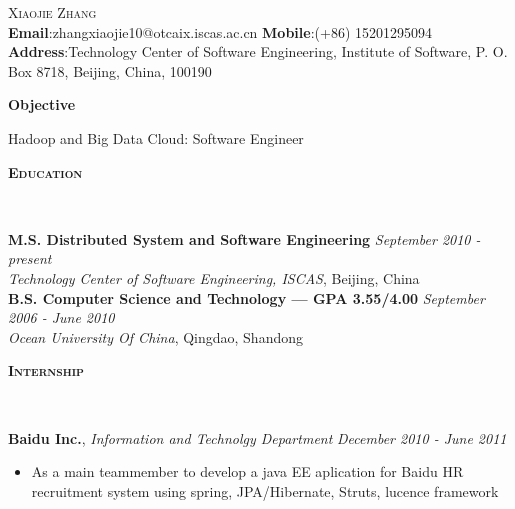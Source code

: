 \documentclass[9pt]{article}
\newenvironment{changemargin}[2]{%
  \begin{list}{}{%
    \setlength{\topsep}{0pt}%
    \setlength{\leftmargin}{#1}%
    \setlength{\rightmargin}{#2}%
    \setlength{\listparindent}{\parindent}%
    \setlength{\itemindent}{\parindent}%
    \setlength{\parsep}{\parskip}%
  }%
  \item[]}{\end{list}
}
\newcommand{\lineover}{
	\begin{changemargin}{-0.05in}{-0.05in}
		\vspace*{-8pt}
		\hrulefill \\
		\vspace*{-2pt}
	\end{changemargin}
}
\newcommand{\header}[1]{
	\begin{changemargin}{-0.5in}{-0.5in}
		\scshape{#1}\\
  	\lineover
	\end{changemargin}
}
\newcommand{\contact}[4]{
	\begin{changemargin}{-0.5in}{-0.5in}
		\begin{center}
			{\Large \scshape {#1}}\\ \smallskip
			{#2}\\ \smallskip 
			{#3}\\ \smallskip
			{#4}\smallskip
		\end{center}
	\end{changemargin}
}
\newenvironment{body} {
	\vspace*{-16pt}
	\begin{changemargin}{-0.25in}{-0.5in}
  }	
	{\end{changemargin}
}
\begin{document}
\contact{Xiaojie Zhang}{ \textbf{Email}:zhangxiaojie10@otcaix.iscas.ac.cn    \textbf {Mobile}:(+86) 15201295094}{\small \textbf{Address}:Technology Center of Software Engineering, Institute of Software, P. O. Box 8718, Beijing, China, 100190
}


\header{\textbf{Objective}}
\begin{body}
	\vspace{14pt}
	Hadoop and Big Data Cloud: Software Engineer
\end{body}

\smallskip


\header{\textbf{Education}}

\begin{body}
	\vspace{14pt}
	\textbf{M.S. Distributed System and Software Engineering }{} \hfill \emph{September 2010 - present}{} \\
	\emph{Technology Center of Software Engineering, ISCAS}, Beijing, China{} \\
  \medskip
	\textbf{B.S. Computer Science and Technology --- GPA 3.55/4.00} \hfill \emph{September 2006 - June 2010} \\
	\emph{Ocean University Of China}, Qingdao, Shandong\\
\end{body}

\smallskip


\header{\textbf{Internship}}

\begin{body}
	\vspace{14pt}
	\textbf{Baidu Inc.}, \emph{Information and Technolgy Department} \hfill \emph{December 2010 - June 2011}\\
	\vspace*{-4pt}
	\begin{itemize} \itemsep -0pt  %
		\item As a main teammember to develop a java EE aplication for Baidu HR recruitment system using spring, JPA/Hibernate, Struts, lucence framework
	\end{itemize}
\end{body}
\end{document}
